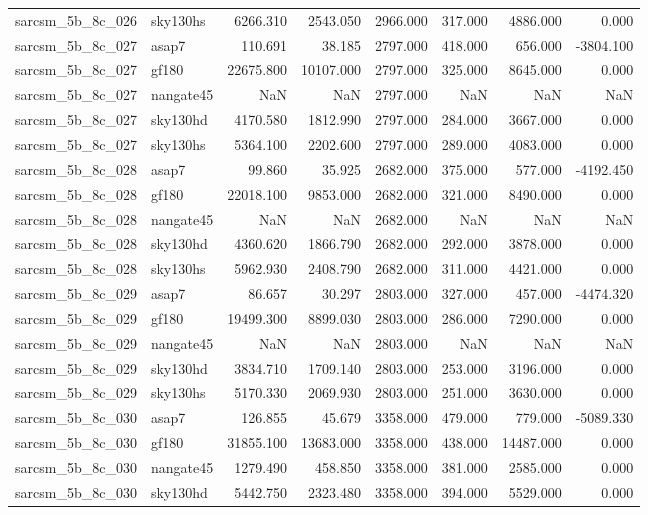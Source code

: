 \begin{tabular}{llrrrrrr}
sarcsm\_5b\_8c\_026 & sky130hs & 6266.310 & 2543.050 & 2966.000 & 317.000 & 4886.000 & 0.000 \\
sarcsm\_5b\_8c\_027 & asap7 & 110.691 & 38.185 & 2797.000 & 418.000 & 656.000 & -3804.100 \\
sarcsm\_5b\_8c\_027 & gf180 & 22675.800 & 10107.000 & 2797.000 & 325.000 & 8645.000 & 0.000 \\
sarcsm\_5b\_8c\_027 & nangate45 & NaN & NaN & 2797.000 & NaN & NaN & NaN \\
sarcsm\_5b\_8c\_027 & sky130hd & 4170.580 & 1812.990 & 2797.000 & 284.000 & 3667.000 & 0.000 \\
sarcsm\_5b\_8c\_027 & sky130hs & 5364.100 & 2202.600 & 2797.000 & 289.000 & 4083.000 & 0.000 \\
sarcsm\_5b\_8c\_028 & asap7 & 99.860 & 35.925 & 2682.000 & 375.000 & 577.000 & -4192.450 \\
sarcsm\_5b\_8c\_028 & gf180 & 22018.100 & 9853.000 & 2682.000 & 321.000 & 8490.000 & 0.000 \\
sarcsm\_5b\_8c\_028 & nangate45 & NaN & NaN & 2682.000 & NaN & NaN & NaN \\
sarcsm\_5b\_8c\_028 & sky130hd & 4360.620 & 1866.790 & 2682.000 & 292.000 & 3878.000 & 0.000 \\
sarcsm\_5b\_8c\_028 & sky130hs & 5962.930 & 2408.790 & 2682.000 & 311.000 & 4421.000 & 0.000 \\
sarcsm\_5b\_8c\_029 & asap7 & 86.657 & 30.297 & 2803.000 & 327.000 & 457.000 & -4474.320 \\
sarcsm\_5b\_8c\_029 & gf180 & 19499.300 & 8899.030 & 2803.000 & 286.000 & 7290.000 & 0.000 \\
sarcsm\_5b\_8c\_029 & nangate45 & NaN & NaN & 2803.000 & NaN & NaN & NaN \\
sarcsm\_5b\_8c\_029 & sky130hd & 3834.710 & 1709.140 & 2803.000 & 253.000 & 3196.000 & 0.000 \\
sarcsm\_5b\_8c\_029 & sky130hs & 5170.330 & 2069.930 & 2803.000 & 251.000 & 3630.000 & 0.000 \\
sarcsm\_5b\_8c\_030 & asap7 & 126.855 & 45.679 & 3358.000 & 479.000 & 779.000 & -5089.330 \\
sarcsm\_5b\_8c\_030 & gf180 & 31855.100 & 13683.000 & 3358.000 & 438.000 & 14487.000 & 0.000 \\
sarcsm\_5b\_8c\_030 & nangate45 & 1279.490 & 458.850 & 3358.000 & 381.000 & 2585.000 & 0.000 \\
sarcsm\_5b\_8c\_030 & sky130hd & 5442.750 & 2323.480 & 3358.000 & 394.000 & 5529.000 & 0.000 \\

\end{tabular}
